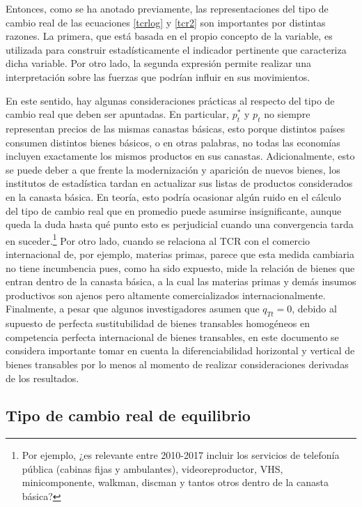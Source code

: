 \documentclass[12pt,letterpaper]{article}
\begin{document}
Entonces, como se ha anotado previamente, las representaciones del tipo de cambio real de las ecuaciones \ref{tcrlog} y \ref{tcr2} son importantes por distintas razones. La primera, que está basada en el propio concepto de la variable, es utilizada para construir estadísticamente el indicador pertinente que caracteriza dicha variable. Por otro lado, la segunda expresión permite realizar una interpretación sobre las fuerzas que podrían influir en sus movimientos.

En este sentido, hay algunas consideraciones prácticas al respecto del tipo de cambio real que deben ser apuntadas. En particular, $p_t^*$ y $p_t$ no siempre representan precios de las mismas canastas básicas, esto porque distintos países consumen distintos bienes básicos, o en otras palabras, no todas las economías incluyen exactamente los mismos productos en sus canastas. Adicionalmente, esto se puede deber a que frente la modernización y aparición de nuevos bienes, los institutos de estadística tardan en actualizar sus listas de productos considerados en la canasta básica. En teoría, esto podría ocasionar algún ruido en el cálculo del tipo de cambio real que en promedio puede asumirse insignificante, aunque queda la duda hasta qué punto esto es perjudicial cuando una convergencia tarda en suceder.\footnote{Por ejemplo, ¿es relevante entre 2010-2017 incluir los servicios de telefonía pública (cabinas fijas y ambulantes), videoreproductor, VHS, minicomponente, walkman, discman y tantos otros dentro de la canasta básica?} Por otro lado, cuando se relaciona al TCR con el comercio internacional de, por ejemplo, materias primas, parece que esta medida cambiaria no tiene incumbencia pues, como ha sido expuesto, mide la relación de bienes que entran dentro de la canasta básica, a la cual las materias primas y demás insumos productivos son ajenos pero altamente comercializados internacionalmente. Finalmente, a pesar que algunos investigadores asumen que $q_{Tt}=0$, debido al supuesto de perfecta sustitubilidad de bienes transables homogéneos en competencia perfecta internacional de bienes transables, en este documento se considera importante tomar en cuenta la diferenciabilidad horizontal y vertical de bienes transables por lo menos al momento de realizar consideraciones derivadas de los resultados.

\subsection*{Tipo de cambio real de equilibrio}
\end{document}
